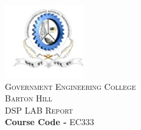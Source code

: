 \includegraphics[scale=1.25]{edit/logogecbh.png}\\[0.25cm] %

\textsc{\LARGE Government Engineering College \\[5mm]Barton Hill}\\[5.75cm] %
\textsc{\Large DSP LAB Report}\\[0.5cm]
\large\textbf{Course Code -} \textsc{EC333}\\[5.75cm] %


